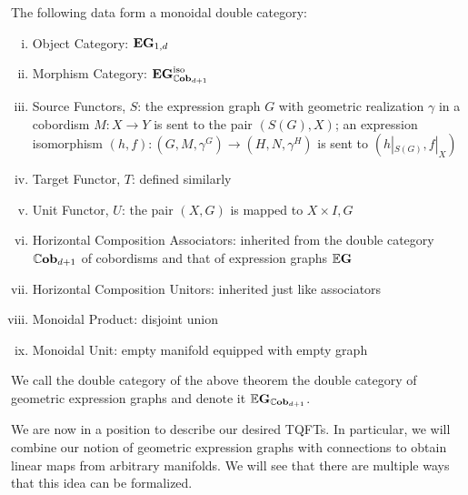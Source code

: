 \documentclass[./Thick_TQFTs_and_Quantum_Information.tex]{subfiles}
\begin{document}
\begin{thm}
The following data form a monoidal double category:
\begin{enumerate}[(i)]
\setlength{\itemsep}{0pt}
\item Object Category: $\textbf{EG}_{1, d}$
\item Morphism Category: $\textbf{EG}_{\mathbb{C}\textbf{ob}_{d + 1}}^{\text{iso}}$
\item Source Functors, $S$: the expression graph $G$ with
geometric realization $\gamma$ in a cobordism $M : X \to Y$ is sent to the pair
$(S(G), X)$; an expression isomorphism
$(h, f) : (G, M, \gamma^G) \to (H, N, \gamma^H)$
is sent to $(h|_{S(G)}, f|_{X})$
\item Target Functor, $T$: defined similarly
\item Unit Functor, $U$: the pair $(X, G)$ is mapped to $X \times I, G$
\item Horizontal Composition Associators: inherited from the double category
$\mathbb{C}\textbf{ob}_{d + 1}$ of cobordisms and that of expression graphs $\mathbb{E}\textbf{G}$
\item Horizontal Composition Unitors: inherited just like associators
\item Monoidal Product: disjoint union
\item Monoidal Unit: empty manifold equipped with empty graph
\end{enumerate}
\end{thm}

\begin{defn}
We call the double category of the above theorem the double category of
geometric expression graphs and denote it $\mathbb{E}\textbf{G}_{\mathbb{C}\textbf{ob}_{d + 1}}$.
\end{defn}

We are now in a position to describe our desired TQFTs. In particular, we will
combine our notion of geometric expression graphs with connections to obtain
linear maps from arbitrary manifolds. We will see that there are multiple ways
that this idea can be formalized.
\end{document}
